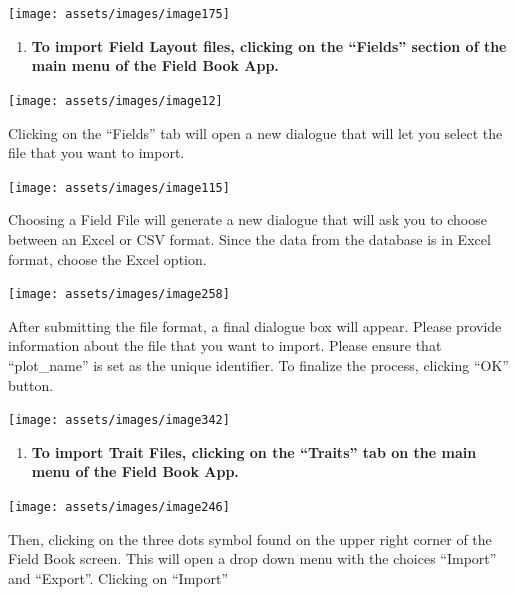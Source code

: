 \documentclass[
  12pt,
]{book}
\providecommand{\tightlist}{%
  \setlength{\itemsep}{0pt}\setlength{\parskip}{0pt}}
\begin{document}
\begin{center}\texttt{[image: assets/images/image175]} \end{center}

\begin{enumerate}
\def\labelenumi{\arabic{enumi}.}
\setcounter{enumi}{1}
\tightlist
\item
  \textbf{To import Field Layout files, clicking on the ``Fields'' section of the main menu of the Field Book App.}
\end{enumerate}

\begin{center}\texttt{[image: assets/images/image12]} \end{center}

Clicking on the ``Fields'' tab will open a new dialogue that will let you select the file that you want to import.

\begin{center}\texttt{[image: assets/images/image115]} \end{center}

Choosing a Field File will generate a new dialogue that will ask you to choose between an Excel or CSV format. Since the data from the database is in Excel format, choose the Excel option.

\begin{center}\texttt{[image: assets/images/image258]} \end{center}

After submitting the file format, a final dialogue box will appear. Please provide information about the file that you want to import. Please ensure that ``plot\_name'' is set as the unique identifier. To finalize the process, clicking ``OK'' button.

\begin{center}\texttt{[image: assets/images/image342]} \end{center}

\begin{enumerate}
\def\labelenumi{\arabic{enumi}.}
\setcounter{enumi}{2}
\tightlist
\item
  \textbf{To import Trait Files, clicking on the ``Traits'' tab on the main menu of the Field Book App.}
\end{enumerate}

\begin{center}\texttt{[image: assets/images/image246]} \end{center}

Then, clicking on the three dots symbol found on the upper right corner of the Field Book screen. This will open a drop down menu with the choices ``Import'' and ``Export''. Clicking on ``Import''
\end{document}
